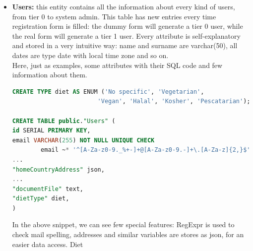 \begin{itemize}
    \item \textbf{Users:} this entity contains all the information about every kind of users, from
    tier 0 to system admin. This table has new entries every time registration form is filled: the dummy
    form will generate a tier 0 user, while the real form will generate a tier 1 user. Every attribute 
    is self-explanatory and stored in a very intuitive way: name and surname are varchar(50), all dates
    are type date with local time zone and so on.\\
    Here, just as examples, some attributes with their SQL code and few information about them.
\begin{lstlisting}[language=SQL]
CREATE TYPE diet AS ENUM ('No specific', 'Vegetarian',
                        'Vegan', 'Halal', 'Kosher', 'Pescatarian');

CREATE TABLE public."Users" (
id SERIAL PRIMARY KEY,
email VARCHAR(255) NOT NULL UNIQUE CHECK 
        email ~* '^[A-Za-z0-9._%+-]+@[A-Za-z0-9.-]+\.[A-Za-z]{2,}$'),
...
"homeCountryAddress" json,
...
"documentFile" text,
"dietType" diet,
)
\end{lstlisting}
    In the above snippet, we can see few special features: RegExpr is used to check mail spelling,
    addresses and similar variables are stores as json, for an easier data access. Diet 
    
\end{itemize}